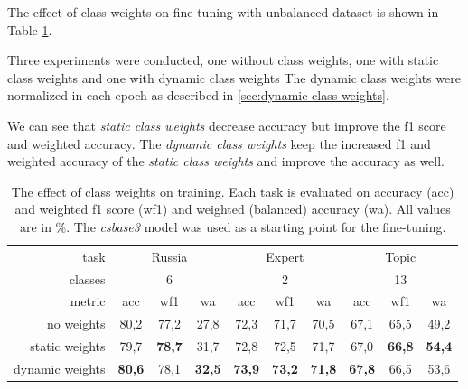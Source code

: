 \documentclass[
  printed, %
  color,   %
  table,   %
  oneside, %
  lof,     %
  lot,     %
]{fithesis3}
\begin{document}
\vspace{1em}
{\parindent=0cm
The effect of class weights on fine-tuning with unbalanced dataset is shown in Table \ref{tab:class-weights-compare}. 
}

Three experiments were conducted, one without class weights, one with static class weights and one with dynamic class weights   
The dynamic class weights were normalized in each epoch as described in \ref{sec:dynamic-class-weights}.

We can see that \textit{static class weights} decrease accuracy but improve the f1 score and weighted accuracy. The \textit{dynamic class weights}  keep the increased f1 and weighted accuracy of the \textit{static class weights} and improve the accuracy as well.


\begin{table}[h]
\centering
\begin{adjustbox}{center}
\begin{tabular}{r|c|c|c|c|c|c|c|c|c}
    task & \multicolumn{3}{c|}{Russia} 
     & \multicolumn{3}{c|}{Expert}
     & \multicolumn{3}{c}{Topic} \\
    
    classes & \multicolumn{3}{c|}{6} & 
    \multicolumn{3}{c|}{2} & 
    \multicolumn{3}{c}{13} \\
    
    metric & acc & wf1 & wa & acc & wf1 & wa & acc & wf1 & wa \\
    \toprule
        no weights & 80,2 & 77,2 & 27,8 & 72,3 & 71,7 & 70,5 & 67,1 & 65,5 & 49,2 \\
        
        static weights & 79,7 & \textbf{78,7} & 31,7 & 72,8 & 72,5 & 71,7 & 67,0 & \textbf{66,8} & \textbf{54,4} \\
        
        dynamic weights & \textbf{80,6} & 78,1 & \textbf{32,5} & \textbf{73,9} & \textbf{73,2} & \textbf{71,8} & \textbf{67,8} & 66,5 & 53,6 \\
\end{tabular}
\end{adjustbox}
\caption[The effect of class weights on training]
{The effect of class weights on training. Each task is evaluated on accuracy (acc) and weighted f1 score (wf1) and weighted (balanced) accuracy (wa). All values are in \%. The \textit{csbase3} model was used as a starting point for the fine-tuning.}
\label{tab:class-weights-compare}
\end{table} %
\end{document}
